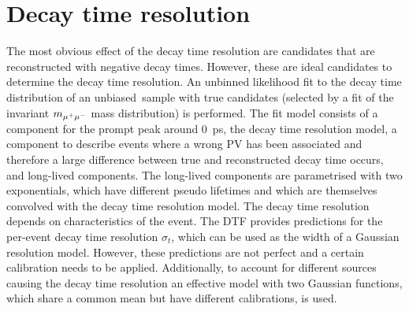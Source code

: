 \section{Decay time resolution}
\label{sec:bd2jpsiks:decaytime:resolution}

The most obvious effect of the decay time resolution are candidates that are
reconstructed with negative decay times. However, these are ideal candidates
to determine the decay time resolution. An unbinned likelihood fit to the
decay time distribution of an unbiased~\BdToJPsiKS sample with true \jpsi
candidates (selected by a fit of the invariant $m_{{\mu^+\mu^-}}$ mass distribution)
is performed. The fit model consists of a component for the prompt peak around
\SI{0}{\ps}, \ie the decay time resolution model, a component to describe
events where a wrong PV has been associated and therefore a large difference
between true and reconstructed decay time occurs, and long-lived components.
The long-lived components are parametrised with two exponentials, which have
different pseudo lifetimes and which are themselves convolved with the decay
time resolution model. The decay time resolution depends on characteristics of
the event. The DTF provides predictions for the per-event decay time
resolution $\sigma_t$, which can be used as the width of a Gaussian
resolution model. However, these predictions are not perfect and a
certain calibration needs to be applied. Additionally, to account for
different sources causing the decay time resolution an effective model with
two Gaussian functions, which share a common mean but have different
calibrations, is used.

